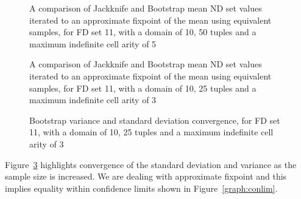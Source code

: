 {\begin{figure}
\begin{minipage}{7cm}
\centerline{}
\end{minipage}
\hfill
\begin{minipage}{7cm}
\centerline{}
\end{minipage}
\caption{\label{graph:7.2} {A comparison of Jackknife and
Bootstrap mean ND set values iterated to an approximate fixpoint of
the mean using equivalent samples, for FD set 11, with a domain of 10,
50 tuples and a maximum indefinite cell arity of 5}}
\end{figure}


\begin{figure}
\begin{minipage}{7cm}
\centerline{}
\end{minipage}
\hfill
\begin{minipage}{7cm}
\centerline{}
\end{minipage}
\caption{\label{graph:7.3} {A comparison of Jackknife and
Bootstrap mean ND set values iterated to an approximate fixpoint of
the mean using equivalent samples, for FD set 11, with a domain of 10,
25 tuples and a maximum indefinite cell arity of 3}}
\end{figure}


\begin{figure}
\begin{minipage}{7cm}
\centerline{}
\end{minipage}
\hfill
\begin{minipage}{7cm}
\centerline{}
\end{minipage}
\caption{\label{graph:7.4} {Bootstrap variance and standard deviation
convergence, for FD set 11, with a domain of 10, 25 tuples and a maximum indefinite cell arity of 3}}
\end{figure}


Figure~\ref{graph:7.4} highlights convergence of the standard
deviation and variance as the sample size is increased. We are dealing
with approximate fixpoint and this implies equality within confidence
limits shown in Figure~\ref{graph:conlim}. 

}
